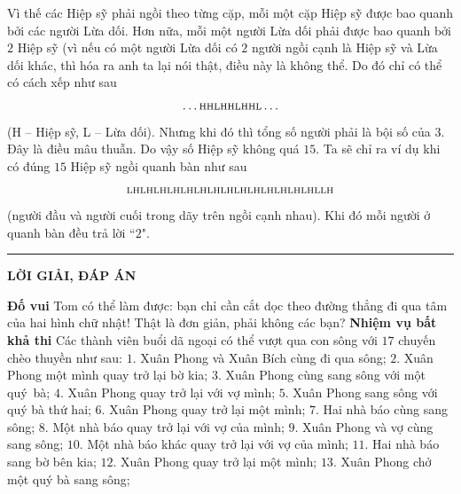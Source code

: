 \begin{multicols}{2}
	\vskip 0.1cm 
	Vì thế các Hiệp sỹ phải ngồi theo từng cặp, mỗi một cặp Hiệp sỹ được bao quanh bởi các người Lừa dối. Hơn nữa, mỗi một người Lừa dối phải được bao quanh bởi $2$ Hiệp sỹ (vì nếu có một người Lừa dối có $2$ người ngồi cạnh là Hiệp sỹ và Lừa dối khác, thì hóa ra anh ta lại nói thật, điều này là không thể. Do đó chỉ có thể có cách xếp như sau
	\begin{align*}
		\ldots\text{\scriptsize{HHLHHLHHL}}\ldots
	\end{align*}
	(H -- Hiệp sỹ, L -- Lừa dối). Nhưng khi đó thì tổng số người phải là bội số của $3$. Đây là điều mâu thuẫn. Do vậy số Hiệp sỹ không quá $15$.
	\vskip 0.1cm
	Ta sẽ chỉ ra ví dụ khi có đúng $15$ Hiệp sỹ ngồi quanh bàn như sau
	\begin{align*}
		\text{\scriptsize{LHLHLHLHLHLHLHLHLHLHLHLHLHLHLLH}}
	\end{align*}
	(người đầu và người cuối trong dãy trên ngồi cạnh nhau). Khi đó mỗi người ở quanh bàn đều trả lời ``$2$".
\end{multicols}
\vspace*{-10pt}
\rule{1\linewidth}{0.1pt}
\begin{center}
	\textbf{\LARGE\color{toancuabi}LỜI GIẢI, ĐÁP ÁN}
\end{center}
\begin{multicols}{2}
	\textbf{\color{toancuabi}Đố vui}
	\vskip 0.1cm
	Tom có thể làm được: bạn chỉ cần cắt dọc theo đường thẳng đi qua tâm của hai
	hình chữ nhật! Thật là đơn giản, phải không các bạn?
	\vskip 0.1cm
	\textbf{\color{toancuabi}Nhiệm vụ bất khả thi}
	\vskip 0.1cm
	Các thành viên buổi dã ngoại có thể vượt qua con sông với $17$ chuyến chèo thuyền như sau:
	\vskip 0.1cm
	$1.$ Xuân Phong và Xuân Bích cùng đi qua sông;
	\vskip 0.1cm
	$2.$ Xuân Phong một mình quay trở lại bờ kia;
	\vskip 0.1cm
	$3.$ Xuân Phong cùng sang sông với một quý~bà;
	\vskip 0.1cm
	$4.$ Xuân Phong quay trở lại với vợ mình;
	\vskip 0.1cm
	$5.$ Xuân Phong sang sông với quý bà thứ hai;
	\vskip 0.1cm
	$6.$ Xuân Phong quay trở lại một mình;
	\vskip 0.1cm
	$7.$ Hai nhà báo cùng sang sông;
	\vskip 0.1cm
	$8.$ Một nhà báo quay trở lại với vợ của mình;
	\vskip 0.1cm
	$9.$ Xuân Phong và vợ cùng sang sông;
	\vskip 0.1cm
	$10.$ Một nhà báo khác quay trở lại với vợ của mình;
	\vskip 0.1cm
	$11.$ Hai nhà báo sang bờ bên kia;
	\vskip 0.1cm
	$12.$ Xuân Phong quay trở lại một mình;
	\vskip 0.1cm
	$13.$ Xuân Phong chở một quý bà sang sông;
\end{multicols}
\newpage
\begingroup
\thispagestyle{toancuabinone}

